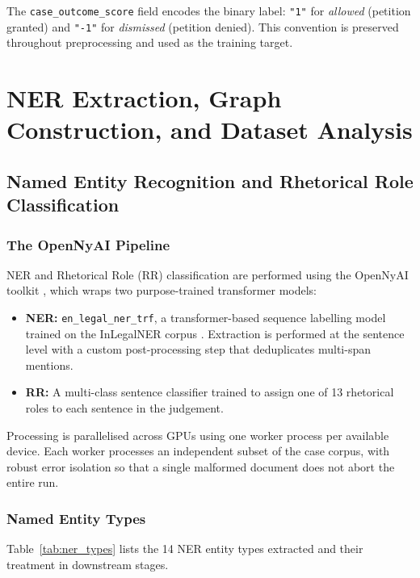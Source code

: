 \documentclass[12pt,a4paper]{report}
\begin{document}
The \texttt{case\_outcome\_score} field encodes the binary label: \texttt{"1"} for \textit{allowed} (petition granted) and \texttt{"-1"} for \textit{dismissed} (petition denied). This convention is preserved throughout preprocessing and used as the training target.

\chapter{NER Extraction, Graph Construction, and Dataset Analysis}
\label{chap:ner_graph}

\section{Named Entity Recognition and Rhetorical Role Classification}
\label{sec:ner}

\subsection{The OpenNyAI Pipeline}

NER and Rhetorical Role (RR) classification are performed using the OpenNyAI toolkit \citep{opennyai2022}, which wraps two purpose-trained transformer models:

\begin{itemize}
  \item \textbf{NER:} \texttt{en\_legal\_ner\_trf}, a transformer-based sequence labelling model trained on the InLegalNER corpus \citep{kalamkar2022named}. Extraction is performed at the sentence level with a custom post-processing step that deduplicates multi-span mentions.
  \item \textbf{RR:} A multi-class sentence classifier trained to assign one of 13 rhetorical roles to each sentence in the judgement.
\end{itemize}

Processing is parallelised across GPUs using one worker process per available device. Each worker processes an independent subset of the case corpus, with robust error isolation so that a single malformed document does not abort the entire run.

\subsection{Named Entity Types}

Table~\ref{tab:ner_types} lists the 14 NER entity types extracted and their treatment in downstream stages.
\end{document}
